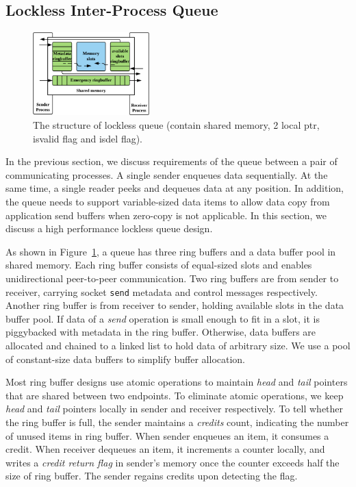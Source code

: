\subsection{Lockless Inter-Process Queue}
\label{subsec:lockless-queue}

\begin{figure}[t]
	\centering
	\includegraphics[width=0.4\textwidth]{images/locklessq}
	\caption{The structure of lockless queue (contain shared memory, 2 local ptr, isvalid flag and isdel flag).}
	\label{fig:locklessq-structure}
\end{figure}

In the previous section, we discuss requirements of the queue between a pair of communicating processes. A single sender enqueues data sequentially. At the same time, a single reader peeks and dequeues data at any position. In addition, the queue needs to support variable-sized data items to allow data copy from application send buffers when zero-copy is not applicable. In this section, we discuss a high performance lockless queue design.

As shown in Figure~\ref{fig:locklessq-structure}, a queue has three ring buffers and a data buffer pool in shared memory. Each ring buffer consists of equal-sized slots and enables unidirectional peer-to-peer communication. Two ring buffers are from sender to receiver, carrying socket \texttt{send} metadata and control messages respectively. Another ring buffer is from receiver to sender, holding available slots in the data buffer pool. If data of a \textit{send} operation is small enough to fit in a slot, it is piggybacked with metadata in the ring buffer. Otherwise, data buffers are allocated and chained to a linked list to hold data of arbitrary size. We use a pool of constant-size data buffers to simplify buffer allocation.

Most ring buffer designs use atomic operations to maintain \textit{head} and \textit{tail} pointers that are shared between two endpoints. To eliminate atomic operations, we keep \textit{head} and \textit{tail} pointers locally in sender and receiver respectively.
To tell whether the ring buffer is full, the sender maintains a \textit{credits} count, indicating the number of unused items in ring buffer. When sender enqueues an item, it consumes a credit. When receiver dequeues an item, it increments a counter locally, and writes a \textit{credit return flag} in sender's memory once the counter exceeds half the size of ring buffer. The sender regains credits upon detecting the flag.

